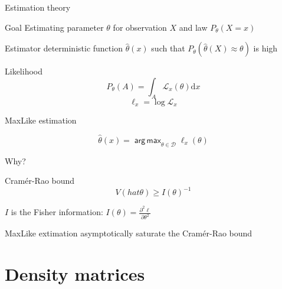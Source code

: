 \documentclass{beamer}
\newcommand{\dd}{\mathrm{d}}
\newcommand{\dparn}[3]{\frac{\partial^{#3} {#1}}{\partial{#2}^{#3}}}
\newcommand{\argmax}{\mathop{\mathsf{arg\,max}}}
\begin{document}
\begin{frame}{Estimation theory}

  \begin{block}{Goal}
    Estimating parameter $\theta$ for observation $X$ and law $P_\theta(X = x)$
  \end{block}

  \pause{}

  \begin{block}{Estimator}
    deterministic function $\hat \theta(x)$ such that $P_\theta(\hat \theta(X)
    \approx \theta)$ is high
  \end{block}

  \pause{}

  \begin{block}{Likelihood}
    \[P_\theta(A) = \int_A \mathcal{L}_x(\theta) \dd x\]
    \[\ell_x = \log \mathcal{L}_x\]
  \end{block}
  
\end{frame}

\begin{frame}{MaxLike estimation}

  \[\hat \theta(x) = \argmax_{\theta \in \mathcal{D}} \ell_x(\theta)\]

\pause{}

  \begin{center}
    \LARGE Why?
  \end{center}

  \pause{}

  \begin{block}{Cramér-Rao bound}
    \[V(hat \theta) \geqslant {I(\theta)}^{-1}\]

    $I$ is the Fisher information: $I(\theta) = \dparn \ell \theta 2$
  \end{block}

  \begin{center}
    MaxLike extimation asymptotically \alert{saturate} the Cramér-Rao bound
  \end{center}




\end{frame}



\section{Density matrices}
\end{document}
